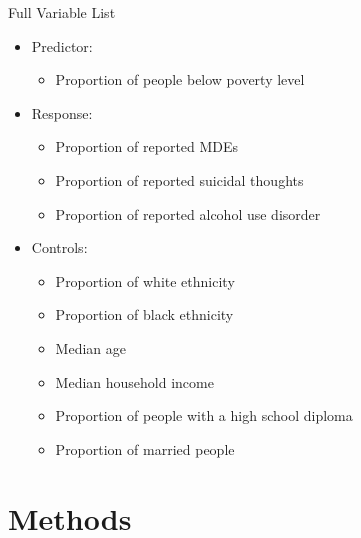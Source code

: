 \documentclass{beamer}
\begin{document}
\begin{frame}{Full Variable List}
    \begin{itemize}
        \item Predictor:
        \begin{itemize}
             \item Proportion of people below poverty level
        \end{itemize}
        \item Response:
        \begin{itemize}
             \item Proportion of reported MDEs
             \item Proportion of reported suicidal thoughts
             \item Proportion of reported alcohol use disorder
        \end{itemize}
        \item Controls:
        \begin{itemize}
             \item Proportion of white ethnicity
             \item Proportion of black ethnicity
             \item Median age
             \item Median household income
             \item Proportion of people with a high school diploma
             \item Proportion of married people
        \end{itemize}
    \end{itemize}
\end{frame}

\section{Methods}
\end{document}

